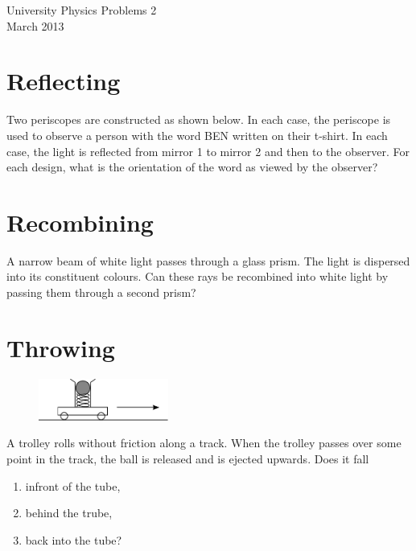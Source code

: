 
\makeatletter
\renewcommand{\@maketitle}{
\newpage
 \null
 \vskip 2em%
 \begin{center}%
  {\Large \@title \par}%
 \end{center}%
 \par} \makeatother

\begin{center}
\Huge University Physics Problems 2\\[1em]
\large March 2013
\end{center}

\section{Reflecting}
Two periscopes are constructed as shown below. In each case, the periscope is used to observe a person with the word BEN written on their t-shirt. In each case, the light is reflected from mirror 1 to mirror 2 and then to the observer. For each design, what is the orientation of the word as viewed by the observer?
\begin{figure}[ht]
  \centering
\end{figure}

\section{Recombining}
A narrow beam of white light passes through a glass prism. The light is dispersed into its constituent colours. Can these rays be recombined into white light by passing them through a second prism?

\section{Throwing}
\begin{figure}
  \vspace{-20pt}
  \begin{center}
  	\includegraphics[width=0.38\textwidth]{trolley1.pdf}
  \end{center}
  \vspace{-20pt}
\end{figure}
A trolley rolls without friction along a track. When the trolley passes over some point in the track, the ball is released and is ejected upwards. Does it fall 
\begin{enumerate}[label=\alph*)]
	\item infront of the tube,
	\item behind the trube,
	\item back into the tube?
\end{enumerate}

